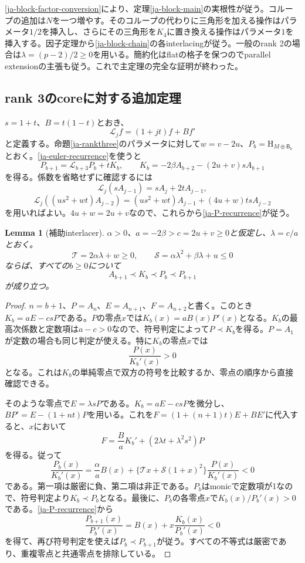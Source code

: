 \documentclass[12pt]{amsart}
\newtheorem{lem}[thm]{Lemma}
\theoremstyle{definition}
\theoremstyle{remark}
\numberwithin{equation}{section}
\newcommand{\HCh}{\mathrm{H}}
\newcommand{\Bmat}{\mathsf{B}}
\newcommand{\Dop}[1]{\mathscr{L}_{#1}}
\begin{document}
\eqref{ja-block-factor-conversion}により、定理\ref{ja-block-main}の実根性が従う。コループの追加は$N$を一つ増やす。そのコループの代わりに三角形を加える操作はパラメータ$1/2$を挿入し、さらにその三角形を$K_4$に置き換える操作はパラメータ$1$を挿入する。因子定理から\eqref{ja-block-chain}の各interlacingが従う。一般のrank 2の場合は$\lambda=(p-2)/2\geq0$を用いる。簡約化はflatの格子を保つのでparallel extensionの主張も従う。これで主定理の完全な証明が終わった。

\subsection{rank 3のcoreに対する追加定理}

$s=1+t$、$B=t(1-t)$とおき、
\[
 \Dop{j}f=(1+jt)f+Bf'
\]
と定義する。命題\ref{ja-rankthree}のパラメータに対して$w=v-2u$、$P_b=\HCh_{M\oplus\Bmat_b}$とおく。\eqref{ja-euler-recurrence}を使うと
\begin{equation}\label{ja-P-recurrence}
 P_{b+1}=\Dop{b+3}P_b+tK_b,\qquad
 K_b=-2\beta A_{b+2}-(2u+v)sA_{b+1}
\end{equation}
を得る。係数を省略せずに確認するには
\[
 \Dop{j}(sA_{j-1})=sA_j+2tA_{j-1},
\]
\[
 \Dop{j}((us^2+wt)A_{j-2})
 =(us^2+wt)A_{j-1}+(4u+w)tsA_{j-2}
\]
を用いればよい。$4u+w=2u+v$なので、これらから\eqref{ja-P-recurrence}が従う。

\begin{samepage}
\begin{lem}[補助interlacer]\label{ja-aux}
$\alpha>0$、$a=-2\beta>c=2u+v\geq0$と仮定し、$\lambda=c/a$とおく。
\[
 \mathcal T=2\alpha\lambda+w\geq0,\qquad
 \mathcal S=\alpha\lambda^2+\beta\lambda+u\leq0
\]
ならば、すべての$b\geq0$について
\[
 A_{b+1}\prec K_b\prec P_b\prec P_{b+1}
\]
が成り立つ。
\end{lem}
\end{samepage}
\begin{proof}
$n=b+1$、$P=A_n$、$E=A_{n+1}$、$F=A_{n+2}$と書く。このとき$K_b=aE-csP$である。$P$の零点$x$では$K_b(x)=aB(x)P'(x)$となる。$K_b$の最高次係数と定数項は$a-c>0$なので、符号判定によって$P\prec K_b$を得る。$P=A_1$が定数の場合も同じ判定が使える。特に$K_b$の零点$x$では
\[
 \frac{P(x)}{K_b'(x)}>0
\]
となる。これは$K_b$の単純零点で双方の符号を比較するか、零点の順序から直接確認できる。

そのような零点で$E=\lambda sP$である。$K_b=aE-csP$を微分し、$BP'=E-(1+nt)P$を用いる。これを$F=(1+(n+1)t)E+BE'$に代入すると、$x$において
\[
 F=\frac{B}{a}K_b'+(2\lambda t+\lambda^2s^2)P
\]
を得る。従って
\begin{equation}\label{ja-aux-eval}
 \frac{P_b(x)}{K_b'(x)}
 =\frac\alpha a B(x)
 +\{\mathcal T x+\mathcal S(1+x)^2\}\frac{P(x)}{K_b'(x)}<0
\end{equation}
である。第一項は厳密に負、第二項は非正である。$P_b$はmonicで定数項が1なので、符号判定より$K_b\prec P_b$となる。最後に、$P_b$の各零点$x$で$K_b(x)/P_b'(x)>0$である。\eqref{ja-P-recurrence}から
\[
 \frac{P_{b+1}(x)}{P_b'(x)}=B(x)+x\frac{K_b(x)}{P_b'(x)}<0
\]
を得て、再び符号判定を使えば$P_b\prec P_{b+1}$が従う。すべての不等式は厳密であり、重複零点と共通零点を排除している。
\end{proof}
\end{document}
